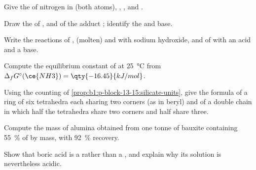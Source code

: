 \begin{exercise}[$\star$]\label{exo:b1:p-block-13-15:1}
Give the  of nitrogen in  (both atoms),
, ,  and .
\end{exercise}

\begin{exercise}[$\star$]\label{exo:b1:p-block-13-15:2}
Draw the  of ,  and of the adduct
; identify the  and base.
\end{exercise}

\begin{exercise}[$\star$]\label{exo:b1:p-block-13-15:3}
Write the reactions of ,  (molten) and  with
sodium hydroxide, and of  with an acid and a base.
\end{exercise}

\begin{exercise}[$\star$]\label{exo:b1:p-block-13-15:4}
Compute the equilibrium constant of  at
\qty{25}{\celsius} from $\Delta_f G^\circ(\ce{NH3}) =
\qty{-16.45}{kJ/mol}$.
\end{exercise}

\begin{exercise}[$\star\star$]\label{exo:b1:p-block-13-15:5}
Using the counting of \cref{prop:b1:p-block-13-15:silicate-units}, give the
formula of a ring of six tetrahedra each sharing two corners (as in beryl)
and of a double chain in which half the tetrahedra share two corners and
half share three.
\end{exercise}

\begin{exercise}[$\star\star$]\label{exo:b1:p-block-13-15:6}
Compute the mass of alumina obtained from one tonne of bauxite containing
\qty{55}{\percent} of  by mass, with \qty{92}{\percent}
recovery.
\end{exercise}

\begin{exercise}[$\star\star$]\label{exo:b1:p-block-13-15:7}
Show that boric acid is a  rather than a , and
explain why its solution is nevertheless acidic.
\end{exercise}

